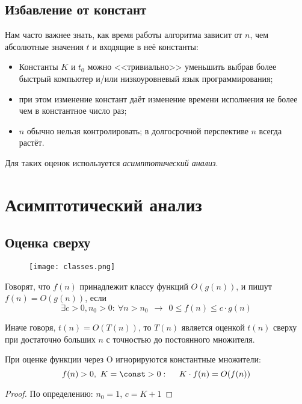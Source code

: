 \subsection*{Избавление от констант}

Нам часто важнее знать, как время работы алгоритма зависит от $n$, чем абсолютные значения $t$ и входящие в неё константы: 
\begin{itemize}
\item Константы $K$ и $t_0$ можно <<тривиально>> уменьшить выбрав более быстрый компьютер и/или низкоуровневый язык программирования;
\item при этом изменение констант даёт изменение времени исполнения не более чем в константное число раз;
\item $n$ обычно нельзя контролировать; в долгосрочной перспективе $n$ всегда растёт. 
\end{itemize}

Для таких оценок используется {\em асимптотический анализ}.

\section{Асимптотический анализ}

\subsection*{Оценка сверху}


\begin{figure}[!ht]
\centering
\texttt{[image: classes.png]}
\end{figure}

\begin{definition}
Говорят, что $f(n)$ принадлежит классу функций $O(g(n))$, и пишут $f(n)=O(g(n))$, если
$$
\exists c>0, n_0>0:~ \forall n > n_0 ~~\to~~ 0 \leqslant f(n) \leqslant c \cdot g(n)
$$

\end{definition}

Иначе говоря, $t(n)=O(T(n))$, то $T(n)$ является оценкой $t(n)$ сверху при достаточно больших $n$ с точностью до постоянного множителя.



\begin{example}
При оценке функции через O игнорируются константные множители:
$$
f(n) > 0,~ K=\const>0: ~~~~ K \cdot f(n) = O(f(n))
$$
\begin{proof}По определению: $n_0=1$, $c=K+1$\end{proof}
\end{example}

